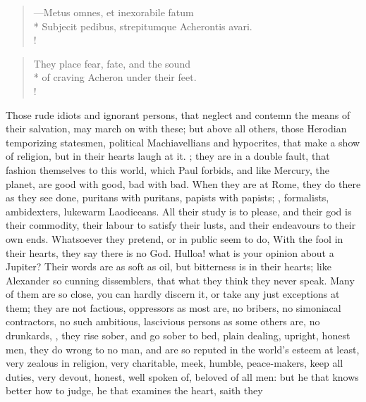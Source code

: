 {\begin{latin}
\begin{verse}%
---Metus omnes, et inexorabile fatum\\*
Subjecit pedibus, strepitumque Acherontis avari.\\!
\end{verse}%
\end{latin}
\translationrule%
\begin{verse}%
They place fear, fate, and the sound\\*
of craving Acheron under their feet.\\!
\end{verse}%

Those rude idiots and ignorant persons, that neglect and contemn the
means of their salvation, may march on with these; but above all
others, those Herodian temporizing statesmen, political Machiavellians
and hypocrites, that make a show of religion, but in their hearts laugh
at it. ; they are in a double fault,
that fashion themselves to this world, which Paul forbids, and
like Mercury, the planet, are good with good, bad with bad. When they
are at Rome, they do there as they see done, puritans with puritans,
papists with papists; , formalists, ambidexters,
lukewarm Laodiceans. All their study is to please, and their god
is their commodity, their labour to satisfy their lusts, and their
endeavours to their own ends. Whatsoever they pretend, or in public
seem to do, With the fool in their hearts, they say there is no
God.  Hulloa! what is your opinion about a
Jupiter? Their words are as soft as oil, but bitterness is in their
hearts; like Alexander so cunning dissemblers, that what they
think they never speak. Many of them are so close, you can hardly
discern it, or take any just exceptions at them; they are not factious,
oppressors as most are, no bribers, no simoniacal contractors, no such
ambitious, lascivious persons as some others are, no drunkards, , they rise sober, and
go sober to bed, plain dealing, upright, honest men, they do wrong to
no man, and are so reputed in the world's esteem at least, very zealous
in religion, very charitable, meek, humble, peace-makers, keep all
duties, very devout, honest, well spoken of, beloved of all men: but he
that knows better how to judge, he that examines the heart, saith they
}

